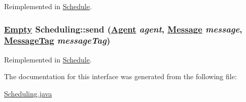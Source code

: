 Reimplemented in \hyperlink{classSchedule_a1}{Schedule}.\hypertarget{interfaceScheduling_a0}{
\subsubsection[send]{\setlength{\rightskip}{0pt plus 5cm}\hyperlink{interfaceEmpty}{Empty} Scheduling::send (\hyperlink{interfaceAgent}{Agent} {\em agent}, \hyperlink{interfaceMessage}{Message} {\em message}, \hyperlink{interfaceMessageTag}{Message\-Tag} {\em message\-Tag})}}
\label{interfaceScheduling_a0}




Reimplemented in \hyperlink{classSchedule_a0}{Schedule}.

The documentation for this interface was generated from the following file:\begin{CompactItemize}
\item 
\hyperlink{Scheduling_8java-source}{Scheduling.java}\end{CompactItemize}
